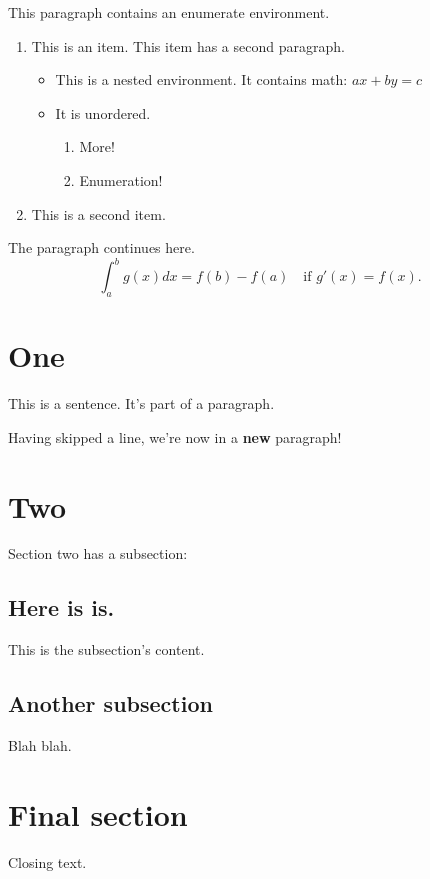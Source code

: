     

        
This paragraph contains an enumerate environment.
\begin{enumerate}
\item This is an item.
This item has a second paragraph.  \begin{itemize}
\item This is a nested environment. It contains math: $ax+by=c$
\item It is unordered.
\begin{enumerate}
\item More!
\item Enumeration!
\end{enumerate}
\end{itemize}
\item This is a second item.
\end{enumerate}
The paragraph continues here.
\[
 \int_a^bg(x)dx = f(b)-f(a)\quad\text{if $g'(x)=f(x)$.}
\]

\section{One}This is a sentence. It's part of a paragraph.

  Having skipped a line, we're now in a \textbf{new} paragraph!\section{Two }

  Section two has a subsection:
\subsection{Here is is.}
  This is the subsection's content.

\subsection{Another subsection}
  Blah blah.

  \section{Final section}
  Closing text.